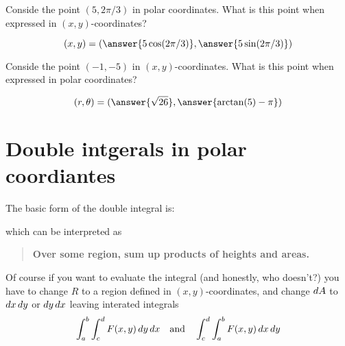 \documentclass{ximera}
\begin{document}
\begin{question}
  Conside the point $(5, 2\pi/3)$ in polar coordinates. What is this
  point when expressed in $(x,y)$-coordinates?
  \begin{prompt}
    \[
    (x,y) = (\answer{5\cos(2\pi/3)}, \answer{5 \sin(2\pi/3)})
    \]
  \end{prompt}
  \begin{question}
    Conside the point $(-1, -5)$ in $(x,y)$-coordinates. What is this
    point when expressed in polar coordinates?
    \begin{prompt}
      \[
      (r,\theta) = (\answer{\sqrt{26}}, \answer{\arctan(5)-\pi})
      \]
    \end{prompt}
  \end{question}
\end{question}

\section{Double intgerals in polar coordiantes}

The basic form of the double integral is:
\begin{image}
\end{image}
which can be interpreted as
\begin{quote}
  \textbf{Over \textcolor{red!50!black}{some region},
    \textcolor{green!70!black!70!blue}{sum up} products of
    \textcolor{purple!50!blue!90!black}{heights} and \textcolor{blue!70!green}{areas}.}
\end{quote}
Of course if you want to evaluate the integral (and honestly, who
doesn't?) you have to change $R$ to a region defined in $(x,y)$-coordinates,
and change $\mathop{}\!d A$ to $\mathop{}\!d x\mathop{}\!d y$ or $\mathop{}\!d y\mathop{}\!d x$ leaving interated integrals
\[
\int_a^b\int_c^d F(x,y) \mathop{}\!d y \mathop{}\!d x\quad\text{and}\quad \int_c^d \int_a^b F(x,y) \mathop{}\!d x\mathop{}\!d y
\]
\end{document}
